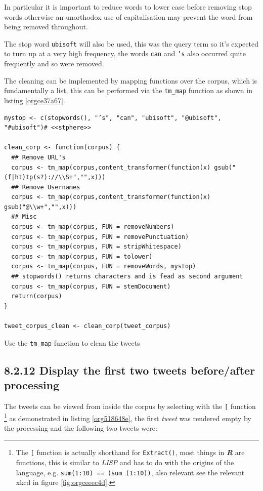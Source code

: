 \documentclass[11pt]{article}
\begin{document}
In particular it is important to reduce words to lower case before removing stop words otherwise an unorthodox use of capitalisation may prevent the word from being removed throughout.

The stop word \texttt{ubisoft} will also be used, this was the query term so it's expected to turn up at a very high frequency, the words \texttt{can} and \texttt{'s} also occurred quite frequently and so were removed.

The cleaning can be implemented by mapping functions over the corpus, which is fundamentally a list, this can be performed via the \texttt{tm\_map} function as shown in listing \ref{orgce37a67}.



\begin{listing}[htbp]
\begin{verbatim}
mystop <- c(stopwords(), "’s", "can", "ubisoft", "@ubisoft", "#ubisoft")# <<stphere>>

clean_corp <- function(corpus) {
  ## Remove URL's
  corpus <- tm_map(corpus,content_transformer(function(x) gsub("(f|ht)tp(s?)://\\S+","",x)))
  ## Remove Usernames
  corpus <- tm_map(corpus,content_transformer(function(x) gsub("@\\w+","",x)))
  ## Misc
  corpus <- tm_map(corpus, FUN = removeNumbers)
  corpus <- tm_map(corpus, FUN = removePunctuation)
  corpus <- tm_map(corpus, FUN = stripWhitespace)
  corpus <- tm_map(corpus, FUN = tolower)
  corpus <- tm_map(corpus, FUN = removeWords, mystop)
  ## stopwords() returns characters and is fead as second argument
  corpus <- tm_map(corpus, FUN = stemDocument)
  return(corpus)
}

tweet_corpus_clean <- clean_corp(tweet_corpus)
\end{verbatim}
\caption{\label{orgce37a67}Use the \texttt{tm\_map} function to clean the tweets}
\end{listing}

\subsection{8.2.12 Display the first two tweets before/after processing}
\label{sec:org35bfb74}
The tweets can be viewed from inside the corpus by selecting with the \texttt{[} function \footnote{The \texttt{[} function is actually shorthand for \texttt{Extract()}, most things in
\textbf{\emph{R}} are functions, this is similar to \emph{LISP} and has to do with the origins of
the language, e.g. \texttt{sum(1:10) == (sum (1:10))}, also relevant see the relevant
xkcd in figure \ref{fig:orgceeec4d}.} as demonstrated in listing \ref{org518648e}, the first \emph{tweet} was rendered empty by the processing and the following two tweets were:
\end{document}
